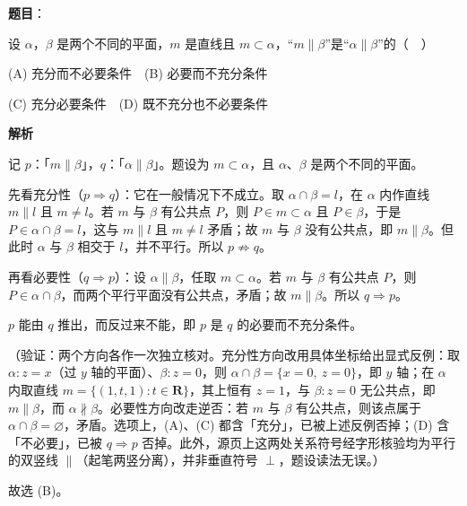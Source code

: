 \begin{answer}

\textbf{题目}：

设 \(\alpha\)，\(\beta\) 是两个不同的平面，\(m\) 是直线且 \(m\subset\alpha\)，“\(m\parallel\beta\)”是“\(\alpha\parallel\beta\)”的（　）

(A) 充分而不必要条件　(B) 必要而不充分条件

(C) 充分必要条件　(D) 既不充分也不必要条件

\textbf{解析}

记 \(p\)：「\(m\parallel\beta\)」，\(q\)：「\(\alpha\parallel\beta\)」。题设为 \(m\subset\alpha\)，且 \(\alpha\)、\(\beta\) 是两个不同的平面。

先看充分性（\(p\Rightarrow q\)）：它在一般情况下不成立。取 \(\alpha\cap\beta=l\)，在 \(\alpha\) 内作直线 \(m\parallel l\) 且 \(m\neq l\)。若 \(m\) 与 \(\beta\) 有公共点 \(P\)，则 \(P\in m\subset\alpha\) 且 \(P\in\beta\)，于是 \(P\in\alpha\cap\beta=l\)，这与 \(m\parallel l\) 且 \(m\neq l\) 矛盾；故 \(m\) 与 \(\beta\) 没有公共点，即 \(m\parallel\beta\)。但此时 \(\alpha\) 与 \(\beta\) 相交于 \(l\)，并不平行。所以 \(p\not\Rightarrow q\)。

再看必要性（\(q\Rightarrow p\)）：设 \(\alpha\parallel\beta\)，任取 \(m\subset\alpha\)。若 \(m\) 与 \(\beta\) 有公共点 \(P\)，则 \(P\in\alpha\cap\beta\)，而两个平行平面没有公共点，矛盾；故 \(m\parallel\beta\)。所以 \(q\Rightarrow p\)。

\(p\) 能由 \(q\) 推出，而反过来不能，即 \(p\) 是 \(q\) 的必要而不充分条件。

（验证：两个方向各作一次独立核对。充分性方向改用具体坐标给出显式反例：取 \(\alpha:z=x\)（过 \(y\) 轴的平面）、\(\beta:z=0\)，则 \(\alpha\cap\beta=\{x=0,\ z=0\}\)，即 \(y\) 轴；在 \(\alpha\) 内取直线 \(m=\{(1,t,1):t\in\mathbf{R}\}\)，其上恒有 \(z=1\)，与 \(\beta:z=0\) 无公共点，即 \(m\parallel\beta\)，而 \(\alpha\not\parallel\beta\)。必要性方向改走逆否：若 \(m\) 与 \(\beta\) 有公共点，则该点属于 \(\alpha\cap\beta=\varnothing\)，矛盾。选项上，(A)、(C) 都含「充分」，已被上述反例否掉；(D) 含「不必要」，已被 \(q\Rightarrow p\) 否掉。此外，源页上这两处关系符号经字形核验均为平行的双竖线 \(\parallel\)（起笔两竖分离），并非垂直符号 \(\perp\)，题设读法无误。）

故选 (B)。


\end{answer}

